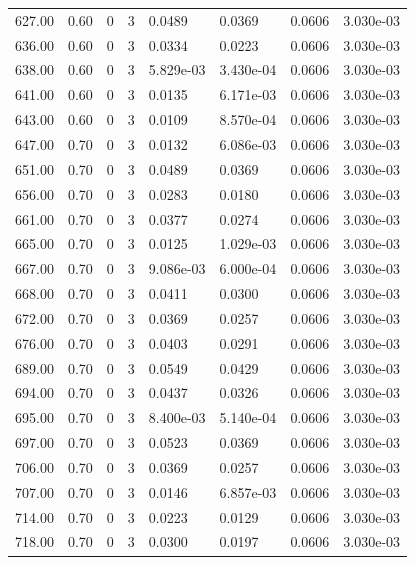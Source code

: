 \documentclass[preview]{standalone}
\begin{document}
{{{{{\begin{tabular}{L{1.2cm}C{1.2cm} C{0.3cm}C{0.5cm} C{1.4cm}C{1.4cm} C{1.4cm}C{1.4cm}}
  627.00  &  0.60  & 0     &  3 &  0.0489  & 0.0369  & 0.0606 &  3.030e-03   \\ 
  636.00  &  0.60  & 0     &  3 &  0.0334  & 0.0223  & 0.0606 &  3.030e-03   \\ 
  638.00  &  0.60  & 0     &  3 &  5.829e-03  & 3.430e-04  & 0.0606 &  3.030e-03   \\ 
  641.00  &  0.60  & 0     &  3 &  0.0135  & 6.171e-03  & 0.0606 &  3.030e-03   \\ 
  643.00  &  0.60  & 0     &  3 &  0.0109  & 8.570e-04  & 0.0606 &  3.030e-03   \\ 
  647.00  &  0.70  & 0     &  3 &  0.0132  & 6.086e-03  & 0.0606 &  3.030e-03   \\ 
  651.00  &  0.70  & 0     &  3 &  0.0489  & 0.0369  & 0.0606 &  3.030e-03   \\ 
  656.00  &  0.70  & 0     &  3 &  0.0283  & 0.0180  & 0.0606 &  3.030e-03   \\ 
  661.00  &  0.70  & 0     &  3 &  0.0377  & 0.0274  & 0.0606 &  3.030e-03   \\ 
  665.00  &  0.70  & 0     &  3 &  0.0125  & 1.029e-03  & 0.0606 &  3.030e-03   \\ 
  667.00  &  0.70  & 0     &  3 &  9.086e-03  & 6.000e-04  & 0.0606 &  3.030e-03   \\ 
  668.00  &  0.70  & 0     &  3 &  0.0411  & 0.0300  & 0.0606 &  3.030e-03   \\ 
  672.00  &  0.70  & 0     &  3 &  0.0369  & 0.0257  & 0.0606 &  3.030e-03   \\ 
  676.00  &  0.70  & 0     &  3 &  0.0403  & 0.0291  & 0.0606 &  3.030e-03   \\ 
  689.00  &  0.70  & 0     &  3 &  0.0549  & 0.0429  & 0.0606 &  3.030e-03   \\ 
  694.00  &  0.70  & 0     &  3 &  0.0437  & 0.0326  & 0.0606 &  3.030e-03   \\ 
  695.00  &  0.70  & 0     &  3 &  8.400e-03  & 5.140e-04  & 0.0606 &  3.030e-03   \\ 
  697.00  &  0.70  & 0     &  3 &  0.0523  & 0.0369  & 0.0606 &  3.030e-03   \\ 
  706.00  &  0.70  & 0     &  3 &  0.0369  & 0.0257  & 0.0606 &  3.030e-03   \\ 
  707.00  &  0.70  & 0     &  3 &  0.0146  & 6.857e-03  & 0.0606 &  3.030e-03   \\ 
  714.00  &  0.70  & 0     &  3 &  0.0223  & 0.0129  & 0.0606 &  3.030e-03   \\ 
  718.00  &  0.70  & 0     &  3 &  0.0300  & 0.0197  & 0.0606 &  3.030e-03   \\ 

\end{tabular}}}}}}
\end{document}
